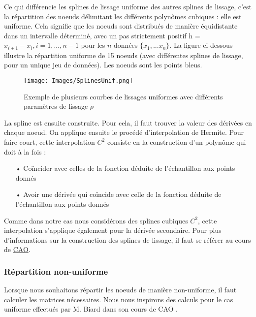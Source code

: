 \documentclass[a4paper,12pt]{article} %
\begin{document}
                Ce qui différencie les splines de lissage uniforme des autres splines de lissage, c'est la répartition des noeuds délimitant les différents polynômes cubiques : elle est uniforme. Cela signifie que les noeuds sont distribués de manière équidistante dans un intervalle déterminé, avec un pas strictement positif h = $x_{i+1} - x_i, i = 1,...,n-1$ pour les $n$ données $\{x_1, ... x_{n}\}$. La figure ci-dessous illustre la répartition uniforme de 15 noeuds (avec différentes splines de lissage, pour un unique jeu de données). Les noeuds sont les points bleus.
                \begin{figure}[H]
                    \centering
                    \texttt{[image: Images/SplinesUnif.png]}
                    \caption{Exemple de plusieurs courbes de lissages uniformes avec différents paramètres de lissage $\rho$  }
                \end{figure}
                
                La spline est ensuite construite. Pour cela, il faut trouver la valeur des dérivées en chaque noeud. On applique ensuite le procédé d'interpolation de Hermite. Pour faire court, cette interpolation $C^2$ consiste en la construction d'un polynôme qui doit à la fois : 
                \begin{itemize}
                \item[•] Coïncider avec celles de la fonction déduite de l'échantillon aux points donnés
                \item[•] Avoir une dérivée qui coïncide avec celle de la fonction déduite de l'échantillon aux points donnés
                \end{itemize}
                Comme dans notre cas nous considérons des splines cubiques $C^2$, cette interpolation s'applique également pour la dérivée secondaire.
                Pour plus d'informations sur la construction des splines de lissage, il faut se référer au cours de \href{http://www-ljk.imag.fr/membres/Luc.Biard/L3MI_cours/Splines.pdf}{CAO}.
                
            
			\subsubsection{Répartition non-uniforme}
			
			    Lorsque nous souhaitons répartir les noeuds de manière non-uniforme, il faut calculer les matrices nécessaires. Nous nous inspirons des calculs pour le cas uniforme effectués par M. Biard dans son cours de CAO \cite{CAO_lissage}. \\
			    
\end{document}
